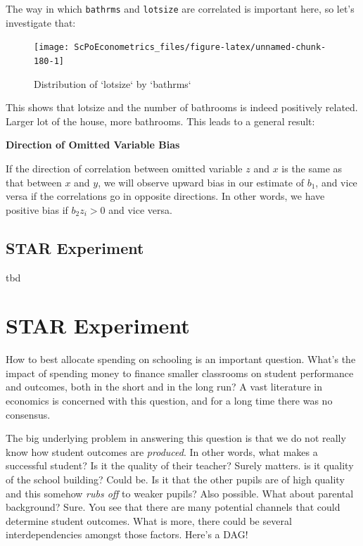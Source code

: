 \documentclass[]{book}
\newenvironment{note}{\begin{tcolorbox}[colback=blue!5!white,colframe=blue!75!black]}{\end{tcolorbox}}
\begin{document}
The way in which \texttt{bathrms} and \texttt{lotsize} are correlated is important here, so let's investigate that:

\begin{figure}

{\centering \texttt{[image: ScPoEconometrics\_files/figure-latex/unnamed-chunk-180-1]} 

}

\caption{Distribution of `lotsize` by `bathrms`}\label{fig:unnamed-chunk-180}
\end{figure}

This shows that lotsize and the number of bathrooms is indeed positively related. Larger lot of the house, more bathrooms. This leads to a general result:

\begin{note}
\textbf{Direction of Omitted Variable Bias}

If the direction of correlation between omitted variable \(z\) and \(x\)
is the same as that between \(x\) and \(y\), we will observe upward bias
in our estimate of \(b_1\), and vice versa if the correlations go in
opposite directions. In other words, we have positive bias if
\(b_2 z_i > 0\) and vice versa.
\end{note}

\hypertarget{star-experiment}{%
\section{STAR Experiment}\label{star-experiment}}

tbd

\hypertarget{STAR}{%
\chapter{STAR Experiment}\label{STAR}}

How to best allocate spending on schooling is an important question. What's the impact of spending money to finance smaller classrooms on student performance and outcomes, both in the short and in the long run? A vast literature in economics is concerned with this question, and for a long time there was no consensus.

The big underlying problem in answering this question is that we do not really know how student outcomes are \emph{produced}. In other words, what makes a successful student? Is it the quality of their teacher? Surely matters. is it quality of the school building? Could be. Is it that the other pupils are of high quality and this somehow \emph{rubs off} to weaker pupils? Also possible. What about parental background? Sure. You see that there are many potential channels that could determine student outcomes. What is more, there could be several interdependencies amongst those factors. Here's a DAG!
\end{document}
